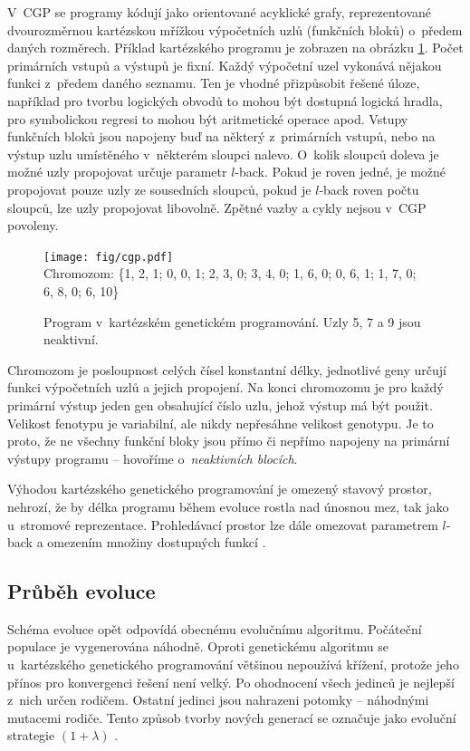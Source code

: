 V~CGP se programy kódují jako orientované acyklické grafy, reprezentované dvourozměrnou kartézskou mřížkou výpočetních uzlů (funkčních bloků) o~předem daných rozměrech. Příklad kartézského programu je zobrazen na obrázku \ref{obrCGP}. Počet primárních vstupů a výstupů je fixní. Každý výpočetní uzel vykonává nějakou funkci z~předem daného seznamu. Ten je vhodné přizpůsobit řešené úloze, například pro tvorbu logických obvodů to mohou být dostupná logická hradla, pro symbolickou regresi to mohou být aritmetické operace apod. Vstupy funkčních bloků jsou napojeny buď na některý z~primárních vstupů, nebo na výstup uzlu umístěného v~některém sloupci nalevo. O~kolik sloupců doleva je možné uzly propojovat určuje parametr $l$-back. Pokud je roven jedné, je možné propojovat pouze uzly ze sousedních sloupců, pokud je $l$-back roven počtu sloupců, lze uzly propojovat libovolně. Zpětné vazby a cykly nejsou v~CGP povoleny.

\begin{figure}[htb]
    \centering\texttt{[image: fig/cgp.pdf]} \\
    {\scriptsize{}Chromozom: \{1, 2, 1; 0, 0, 1; 2, 3, 0; 3, 4, 0; 1, 6, 0; 0, 6, 1; 1, 7, 0; 6, 8, 0; 6, 10\}}
    \caption{Program v~kartézském genetickém programování. Uzly 5, 7 a 9 jsou neaktivní.}
    \label{obrCGP}
\end{figure}

Chromozom je posloupnost celých čísel konstantní délky, jednotlivé geny určují funkci výpočetních uzlů a jejich propojení. Na konci chromozomu je pro každý primární výstup jeden gen obsahující číslo uzlu, jehož výstup má být použit. Velikost fenotypu je variabilní, ale nikdy nepřesáhne velikost genotypu. Je to proto, že ne všechny funkční bloky jsou přímo či nepřímo napojeny na primární výstupy programu -- hovoříme o~\emph{neaktivních blocích}.

Výhodou kartézského genetického programování je omezený stavový prostor, nehrozí, že by délka programu během evoluce rostla nad únosnou mez, tak jako u~stromové reprezentace. Prohledávací prostor lze dále omezovat parametrem $l$-back a omezením množiny dostupných funkcí \cite{ZelenaCGP, Modra, HandbookGP}.

\subsection{Průběh evoluce}
\label{secCGPEvo}

Schéma evoluce opět odpovídá obecnému evolučnímu algoritmu. Počáteční populace je vygenerována náhodně. Oproti genetickému algoritmu se u~kartézského genetického programování většinou nepoužívá křížení, protože jeho přínos pro konvergenci řešení není velký. Po ohodnocení všech jedinců je nejlepší z~nich určen rodičem. Ostatní jedinci jsou nahrazeni potomky -- náhodnými mutacemi rodiče. Tento způsob tvorby nových generací se označuje jako evoluční strategie $(1 + \lambda)$ \cite{Modra}.

